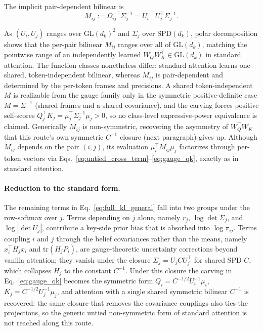\documentclass[11pt]{article}
\begin{document}
The implicit pair-dependent bilinear is
\begin{equation}
M_{ij} := \Omega_{ij}^{-\top}\Sigma_j^{-1} = U_i^{-\top} U_j^\top \Sigma_j^{-1}.
\label{eq:gauge_bilinear}
\end{equation}

As $(U_i, U_j)$ ranges over $\mathrm{GL}(d_k)^2$ and $\Sigma_j$ over $\mathrm{SPD}(d_k)$, polar decomposition shows that the per-pair bilinear $M_{ij}$ ranges over all of $\mathrm{GL}(d_k)$, matching the pointwise range of an independently learned $W_Q W_K^\top \in \mathrm{GL}(d_k)$ in standard attention. The function classes nonetheless differ: standard attention learns one shared, token-independent bilinear, whereas $M_{ij}$ is pair-dependent and determined by the per-token frames and precisions. A shared token-independent $M$ is realizable from the gauge family only in the symmetric positive-definite case $M = \Sigma^{-1}$ (shared frames and a shared covariance), and the carving forces positive self-scores $Q_j^\top K_j = \mu_j^\top\Sigma_j^{-1}\mu_j > 0$, so no class-level expressive-power equivalence is claimed. Generically $M_{ij}$ is non-symmetric, recovering the asymmetry of $W_Q^\top W_K$ that this route's own symmetric $C^{-1}$ closure (next paragraph) gives up. Although $M_{ij}$ depends on the pair $(i,j)$, its evaluation $\mu_i^\top M_{ij}\mu_j$ factorizes through per-token vectors via Eqs.~\eqref{eq:untied_cross_term}--\eqref{eq:gauge_qk}, exactly as in standard attention.

\paragraph{Reduction to the standard form.}
The remaining terms in Eq.~\eqref{eq:full_kl_general} fall into two groups under the row-softmax over $j$. Terms depending on $j$ alone, namely $r_j$, $\log\det\Sigma_j$, and $\log|\det U_j|$, contribute a key-side prior bias that is absorbed into $\log\pi_{ij}$. Terms coupling $i$ and $j$ through the belief covariances rather than the means, namely $x_i^\top H_j x_i$ and $\mathrm{tr}(H_j P_i)$, are gauge-theoretic uncertainty corrections beyond vanilla attention; they vanish under the closure $\Sigma_j = U_j C U_j^\top$ for shared SPD $C$, which collapses $H_j$ to the constant $C^{-1}$. Under this closure the carving in Eq.~\eqref{eq:gauge_qk} becomes the symmetric form $Q_i = C^{-1/2}U_i^{-1}\mu_i$, $K_j = C^{-1/2}U_j^{-1}\mu_j$, and attention with a single shared symmetric bilinear $C^{-1}$ is recovered: the same closure that removes the covariance couplings also ties the projections, so the generic untied non-symmetric form of standard attention is not reached along this route.
\end{document}
